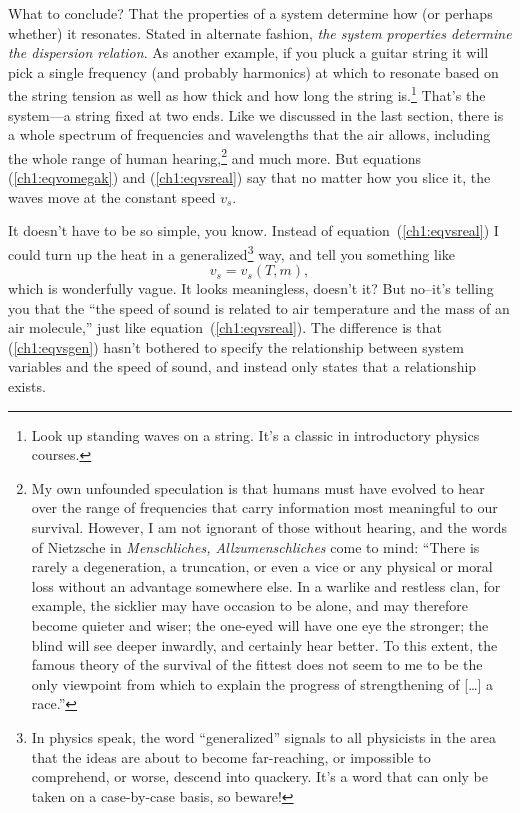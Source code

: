 What to conclude? That the properties of a system determine how (or perhaps
whether) it resonates. Stated in alternate fashion, \emph{the system properties
  determine the dispersion relation}.  As another example, if you pluck a guitar
string it will pick a single frequency (and probably harmonics) at which to
resonate based on the string tension as well as how thick and how long the
string is.\footnote{Look up standing waves on a string. It's a classic in
  introductory physics courses.} That's the system---a string fixed at two
ends. Like we discussed in the last section, there is a whole spectrum of
frequencies and wavelengths that the air allows, including the whole range of
human hearing,\footnote{My own unfounded speculation is that humans must have
  evolved to hear over the range of frequencies that carry information most
  meaningful to our survival. However, I am not ignorant of those without
  hearing, and the words of Nietzsche in \textit{Menschliches,
    Allzumenschliches} come to mind: ``There is rarely a degeneration, a
  truncation, or even a vice or any physical or moral loss without an advantage
  somewhere else. In a warlike and restless clan, for example, the sicklier may
  have occasion to be alone, and may therefore become quieter and wiser; the
  one-eyed will have one eye the stronger; the blind will see deeper inwardly,
  and certainly hear better. To this extent, the famous theory of the survival
  of the fittest does not seem to me to be the only viewpoint from which to
  explain the progress of strengthening of [\dots] a race.''} and much more. But
equations (\ref{ch1:eqvomegak}) and (\ref{ch1:eqvsreal}) say that no matter how
you slice it, the waves move at the constant speed $v_s$.

It doesn't have to be so simple, you know. Instead of
equation~(\ref{ch1:eqvsreal}) I could turn up the heat in a
generalized\footnote{In physics speak, the word ``generalized'' signals to all
  physicists in the area that the ideas are about to become far-reaching, or
  impossible to comprehend, or worse, descend into quackery. It's a word that
  can only be taken on a case-by-case basis, so beware!}  way, and tell you
something like
\begin{equation}
  \label{ch1:eqvsgen}
  v_s = v_s (T, m),
\end{equation}
which is wonderfully vague. It looks meaningless, doesn't it? But no--it's
telling you that the ``the speed of sound is related to air temperature and the
mass of an air molecule,'' just like equation~(\ref{ch1:eqvsreal}). The
difference is that (\ref{ch1:eqvsgen}) hasn't bothered to specify the
relationship between system variables and the speed of sound, and instead only
states that a relationship exists.

